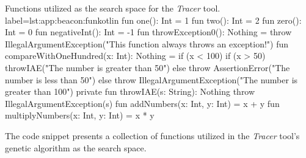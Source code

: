 \begin{code}{%
    Functions utilized as the search space for the \textit{Tracer} tool.
}{label=lst:app:beacon:fun}{kotlin}
    fun one(): Int = 1
    fun two(): Int = 2
    fun zero(): Int = 0
    fun negativeInt(): Int = -1
    fun throwException0(): Nothing = 
        throw IllegalArgumentException("This function always throws an exception!")
    fun compareWithOneHundred(x: Int): Nothing = if (x < 100) {
        if (x > 50) throwIAE("The number is greater than 50")
        else throw AssertionError("The number is less than 50")
    } else {
        throw IllegalArgumentException("The number is greater than 100")
    }
    private fun throwIAE(s: String): Nothing {
        throw IllegalArgumentException(s)
    }
    fun addNumbers(x: Int, y: Int) = x + y
    fun multiplyNumbers(x: Int, y: Int) = x * y
\end{code}

The code snippet presents a collection of functions utilized in the \textit{Tracer} tool's genetic algorithm as the 
search space.

